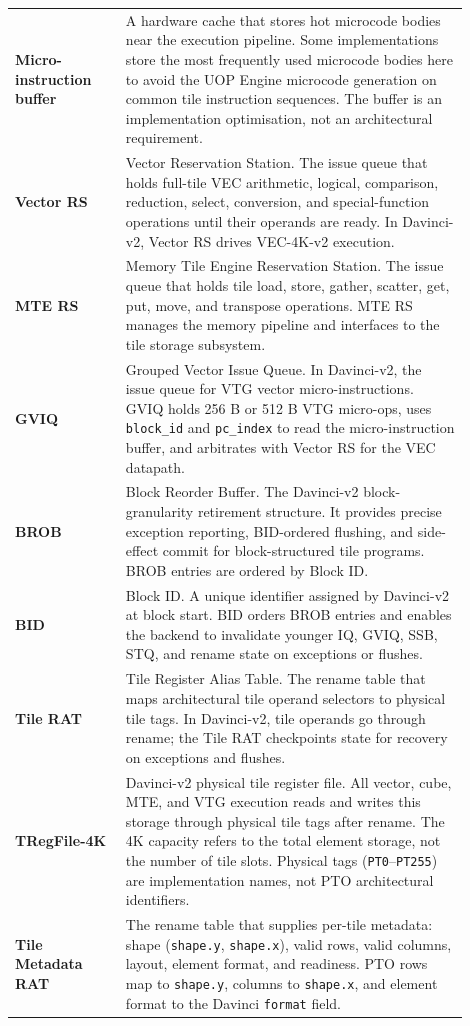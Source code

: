 \begin{longtable}{@{}L{0.22\linewidth}L{0.68\linewidth}@{}}
\textbf{Micro-instruction buffer} & A hardware cache that stores hot microcode bodies near the execution pipeline. Some implementations store the most frequently used microcode bodies here to avoid the UOP Engine microcode generation on common tile instruction sequences. The buffer is an implementation optimisation, not an architectural requirement. \\
\textbf{Vector RS} & Vector Reservation Station. The issue queue that holds full-tile VEC arithmetic, logical, comparison, reduction, select, conversion, and special-function operations until their operands are ready. In Davinci-v2, Vector RS drives VEC-4K-v2 execution. \\
\textbf{MTE RS} & Memory Tile Engine Reservation Station. The issue queue that holds tile load, store, gather, scatter, get, put, move, and transpose operations. MTE RS manages the memory pipeline and interfaces to the tile storage subsystem. \\
\textbf{GVIQ} & Grouped Vector Issue Queue. In Davinci-v2, the issue queue for VTG vector micro-instructions. GVIQ holds 256 B or 512 B VTG micro-ops, uses \texttt{block\_id} and \texttt{pc\_index} to read the micro-instruction buffer, and arbitrates with Vector RS for the VEC datapath. \\
\textbf{BROB} & Block Reorder Buffer. The Davinci-v2 block-granularity retirement structure. It provides precise exception reporting, BID-ordered flushing, and side-effect commit for block-structured tile programs. BROB entries are ordered by Block ID. \\
\textbf{BID} & Block ID. A unique identifier assigned by Davinci-v2 at block start. BID orders BROB entries and enables the backend to invalidate younger IQ, GVIQ, SSB, STQ, and rename state on exceptions or flushes. \\
\textbf{Tile RAT} & Tile Register Alias Table. The rename table that maps architectural tile operand selectors to physical tile tags. In Davinci-v2, tile operands go through rename; the Tile RAT checkpoints state for recovery on exceptions and flushes. \\
\textbf{TRegFile-4K} & Davinci-v2 physical tile register file. All vector, cube, MTE, and VTG execution reads and writes this storage through physical tile tags after rename. The 4K capacity refers to the total element storage, not the number of tile slots. Physical tags (\texttt{PT0}--\texttt{PT255}) are implementation names, not PTO architectural identifiers. \\
\textbf{Tile Metadata RAT} & The rename table that supplies per-tile metadata: shape (\texttt{shape.y}, \texttt{shape.x}), valid rows, valid columns, layout, element format, and readiness. PTO rows map to \texttt{shape.y}, columns to \texttt{shape.x}, and element format to the Davinci \texttt{format} field. \\

\end{longtable}
